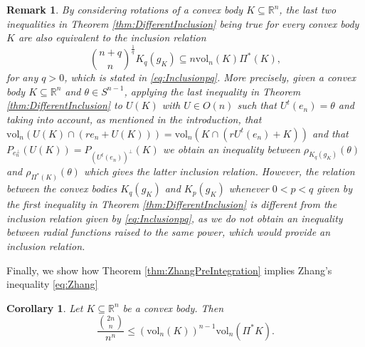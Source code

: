 \documentclass[10pt]{amsart}
\newtheorem{cor}[thm]{Corollary}
\newtheorem{rmk}[thm]{Remark}
\def\R{\mathbb{R}}
\def\vol{\mathrm{vol}}
\numberwithin{equation}{section}
\begin{document}
\begin{rmk}
By considering rotations of a convex body $K\subseteq\R^n$, the last two inequalities in Theorem \ref{thm:DifferentInclusion} being true for every convex body $K$ are also equivalent to the inclusion relation
$$
{{n+q}\choose{n}}^\frac{1}{q}K_q(g_K)\subseteq n\vol_n(K)\Pi^*(K),
$$
for any $q>0$, which is stated in \eqref{eq:Inclusionpq}. More precisely, given a convex body $K\subseteq\R^n$ and $\theta\in S^{n-1}$, applying the last inequality in Theorem \ref{thm:DifferentInclusion} to $U(K)$ with $U\in O(n)$ such that $U^t(e_n)=\theta$ and taking into account, as mentioned in the introduction, that $\vol_n(U(K)\cap(re_n+U(K)))=\vol_n(K\cap(rU^t(e_n)+K))$ and that $P_{e_n^\perp}(U(K))=P_{(U^t(e_n))^\perp}(K)$ we obtain an inequality between $\rho_{K_q(g_K)}(\theta)$ and $\rho_{\Pi^*(K)}(\theta)$ which gives the latter inclusion relation. However, the relation between the convex bodies $K_q(g_K)$ and $K_p(g_K)$ whenever $0<p<q$ given by the first inequality in Theorem \ref{thm:DifferentInclusion} is different from the inclusion relation given by \eqref{eq:Inclusionpq}, as we do not obtain an inequality between radial functions raised to the same power, which would provide an inclusion relation.
\end{rmk}

Finally, we show how Theorem \ref{thm:ZhangPreIntegration} implies Zhang's inequality \eqref{eq:Zhang}

\begin{cor}\label{cor:Zhang}
Let $K\subseteq\R^n$ be a convex body. Then
$$
\frac{{{2n}\choose{n}}}{n^n}\leq(\vol_n(K))^{n-1}\vol_n(\Pi^*K).
$$
\end{cor}
\end{document}
